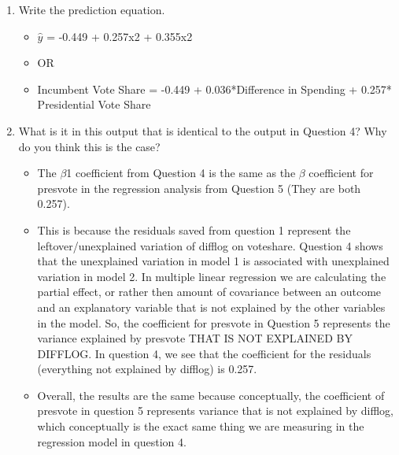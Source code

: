 \documentclass[12pt,letterpaper]{article}
\begin{document}
\begin{enumerate}
		\item Write the prediction equation.
		
		
\begin{itemize}
	\item  $\hat{y}$ = -0.449 + 0.257x2 + 0.355x2
	\item OR
	\item Incumbent Vote Share = -0.449 + 0.036*Difference in Spending + 0.257* Presidential Vote Share
\end{itemize}
		

		\item What is it in this output that is identical to the output in Question 4? Why do you think this is the case?
		
\begin{itemize}
	\item The $\beta$1 coefficient from Question 4 is the same as the $\beta$ coefficient for presvote in the regression analysis from Question 5 (They are both 0.257).
	\item This is because the residuals saved from question 1 represent the leftover/unexplained variation of difflog on voteshare. Question 4 shows that the unexplained variation in model 1 is associated with unexplained variation in model 2. In multiple linear regression we are calculating the partial effect, or rather then amount of covariance between an outcome and an explanatory variable that is not explained by the other variables in the model. So, the coefficient for presvote in Question 5 represents the variance explained by presvote THAT IS NOT EXPLAINED BY DIFFLOG. In question 4, we see that the coefficient for the residuals (everything not explained by difflog) is 0.257.
	\item Overall, the results are the same because conceptually, the coefficient of presvote in question 5 represents variance that is not explained by difflog, which conceptually is the exact same thing we are measuring in the regression model in question 4.
\end{itemize}	



	\end{enumerate}
\end{document}

